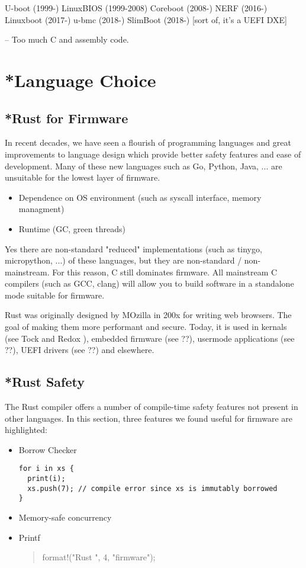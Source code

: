 \documentclass[conference]{IEEEtran}
\begin{document}
U-boot (1999-)
LinuxBIOS (1999-2008)
Coreboot (2008-)
NERF (2016-)
Linuxboot (2017-)
u-bmc (2018-)
SlimBoot (2018-) [sort of, it’s a UEFI DXE]

-- Too much C and assembly code.

\section{*Language Choice}

\subsection{*Rust for Firmware}

In recent decades, we have seen a flourish of programming languages and great improvements to language design which provide better safety features and ease of development. Many of these new languages such as Go, Python, Java, ... are unsuitable for the lowest layer of firmware.

\begin{itemize}
    \item Dependence on OS environment (such as syscall interface, memory managment)
    \item Runtime (GC, green threads)
\end{itemize}

Yes there are non-standard "reduced" implementations (such as tinygo, micropython, ...) of these languages, but they are non-standard / non-mainstream. For this reason, C still dominates firmware. All mainstream C compilers (such as GCC, clang) will allow you to build software in a standalone mode suitable for firmware.

Rust was originally designed by MOzilla in 200x for writing web browsers. The goal of making them more performant and secure. Today, it is used in kernals (see Tock \cite{b1} and Redox \cite{b3}), embedded firmware (see ??), usermode applications (see ??), UEFI drivers (see ??) and elsewhere.

\subsection{*Rust Safety}

The Rust compiler offers a number of compile-time safety features not present in other languages. In this section, three features we found useful for firmware are highlighted:

\begin{itemize}
    \item Borrow Checker
        \begin{verbatim}
for i in xs {
  print(i);
  xs.push(7); // compile error since xs is immutably borrowed
}
        \end{verbatim}
    \item Memory-safe concurrency
    \item Printf \begin{quote}format!("Rust {} {}", 4, "firmware");\end{quote}
\end{itemize}
\end{document}
